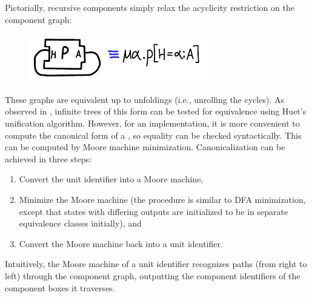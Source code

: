 


Pictorially, recursive components simply relax the acyclicity restriction on
the component graph:

\begin{figure}[H]
\center\includegraphics{figures/recursive-unit-identifier.pdf}
\end{figure}

These graphs are equivalent up to unfoldings (i.e., unrolling the
cycles).
As observed in \OldBackpack{}, infinite trees of this form
can be tested for equivalence using Huet's unification algorithm.
However, for an implementation, it is more convenient to compute the canonical form
of a \uid{}, so equality can be checked syntactically.  This can be
computed by Moore machine minimization.  Canonicalization can be achieved
in three steps:

\begin{enumerate}
\item Convert the unit identifier into a Moore machine,
\item Minimize the Moore machine (the procedure is similar to DFA
   minimization, except that states with differing outputs are
   initialized to be in separate equivalence classes initially), and
\item Convert the Moore machine back into a unit identifier.
\end{enumerate}
%
Intuitively, the Moore machine of a unit identifier recognizes paths
(from right to left) through the component graph, outputting the
component identifiers of the component boxes it traverses.

